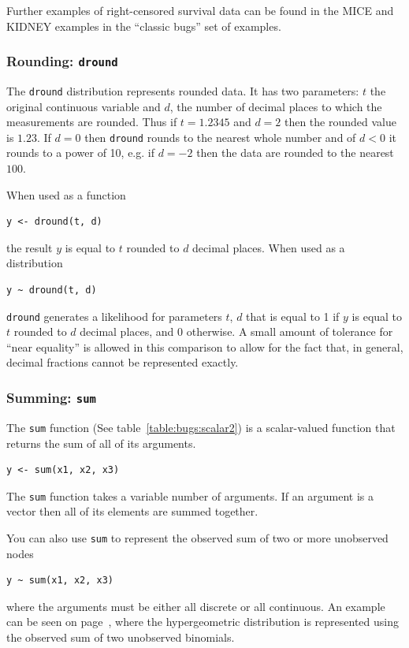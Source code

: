 \documentclass[11pt, a4paper, titlepage]{report}
\begin{document}
Further examples of right-censored survival data can be found in the
MICE and KIDNEY examples in the ``classic bugs'' set of examples.

\subsubsection{Rounding: \texttt{dround}}

The \texttt{dround} distribution represents rounded data. It has two
parameters: $t$ the original continuous variable and $d$, the number
of decimal places to which the measurements are rounded. Thus if
$t=1.2345$ and $d=2$ then the rounded value is $1.23$. If $d=0$ then
\texttt{dround} rounds to the nearest whole number and of $d < 0$ it
rounds to a power of 10, e.g. if $d=-2$ then the data are rounded to
the nearest $100$.

When used as a function
\begin{verbatim}
y <- dround(t, d)
\end{verbatim}
the result $y$ is equal to $t$ rounded to $d$ decimal places. When
used as a distribution
\begin{verbatim}
y ~ dround(t, d)
\end{verbatim}
\texttt{dround} generates a likelihood for parameters $t$, $d$ that is
equal to 1 if $y$ is equal to $t$ rounded to $d$ decimal places, and 0
otherwise. A small amount of tolerance for ``near equality'' is
allowed in this comparison to allow for the fact that, in general,
decimal fractions cannot be represented exactly.

\subsubsection{Summing: \texttt{sum}}
\label{bugs:sum}

The \texttt{sum} function (See table~\ref{table:bugs:scalar2}) is
a scalar-valued function that returns the sum of all of its arguments.
\begin{verbatim}
y <- sum(x1, x2, x3)
\end{verbatim}
The \texttt{sum} function takes a variable number of arguments. If
an argument is a vector then all of its elements are summed together.

You can also use \texttt{sum} to represent the observed sum of two
or more unobserved nodes
\begin{verbatim}
y ~ sum(x1, x2, x3)
\end{verbatim}
where the arguments must be either all discrete or all continuous.  An
example can be seen on page~\pageref{bugs:dhyper}, where the
hypergeometric distribution is represented using the observed sum of
two unobserved binomials.
\end{document}
